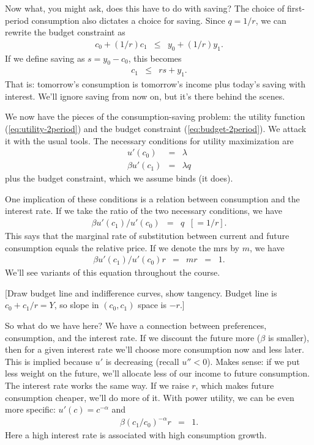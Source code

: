 \documentclass[11pt]{article}
\begin{document}

Now what, you might ask, does this have to do with saving?
The choice of first-period consumption also dictates a choice for saving.
Since $q = 1/r$, we can rewrite the budget constraint as
\begin{eqnarray*}
    c_0 + (1/r) c_1 &\leq& y_0 + (1/r) y_1 .
\end{eqnarray*}
If we define saving as $s = y_0 - c_0$,
this becomes
\begin{eqnarray*}
    c_1  &\leq& r s +  y_1 .
\end{eqnarray*}
That is:  tomorrow's consumption is tomorrow's income
plus today's saving with interest.
We'll ignore saving from now on, but it's there behind the scenes.

We now have the pieces of the consumption-saving problem:
the utility function (\ref{eq:utility-2period})
and the budget constraint (\ref{eq:budget-2period}).
We attack it with the usual tools.
The necessary conditions for utility maximization are
\begin{eqnarray*}
        u'(c_0)  &=& \lambda  \\
       \beta u'(c_1)  &=& \lambda q
\end{eqnarray*}
plus the budget constraint, which we assume binds (it does).

One implication of these conditions is a relation
between consumption and the interest rate.
If we take the ratio of the two necessary conditions,
we have
\begin{eqnarray*}
       \beta u'(c_1)/u'(c_0)  &=& q \;\; [= 1/r].
\end{eqnarray*}
This says that the marginal rate of substitution
between current and future consumption equals
the relative price.
If we denote the mrs by $m$, we have
\begin{eqnarray}
       \beta u'(c_1)/u'(c_0)  r  &=& m r \;\;=\;\;  1 .
       \label{eq:euler-deterministic}
\end{eqnarray}
We'll see variants of this equation throughout the course.

[Draw budget line and indifference curves, show tangency.
Budget line is $c_0 + c_1/r = Y$, so slope in $(c_0,c_1)$ space
is $-r$.]

So what do we have here?  We have a connection between
preferences, consumption, and the interest rate.
If we discount the future more ($\beta$ is smaller),
then for a given interest rate we'll choose
more consumption now and less later.
This is implied because $u'$ is decreasing (recall $u''<0$).
Makes sense:  if we put less weight on the future,
we'll allocate less of our income to future consumption.
The interest rate works the same way.
If we raise $r$, which makes future consumption cheaper,
we'll do more of it.
With power utility, we can be even more specific:
$u'(c) = c^{-\alpha}$ and
\begin{eqnarray*}
       \beta (c_1/c_0)^{-\alpha}  r  &=& 1 .
\end{eqnarray*}
Here a high interest rate is associated with
high consumption growth.
\end{document}
